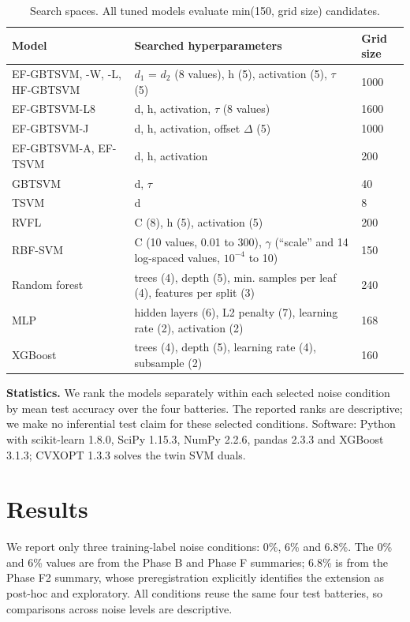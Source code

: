 \documentclass[conference,a4paper]{IEEEtran}
\begin{document}
\begin{table}[!t]
\centering
\small
\caption{Search spaces. All tuned models evaluate min(150, grid size) candidates.}
\label{tab:3}
\begin{tabularx}{\textwidth}{lXl}
\toprule
Model & Searched hyperparameters & Grid size \\
\midrule
EF-GBTSVM, -W, -L, HF-GBTSVM & $d_{1}$ = $d_{2}$ (8 values), h (5), activation (5), $\tau$ (5) & 1000 \\
EF-GBTSVM-L8 & d, h, activation, $\tau$ (8 values) & 1600 \\
EF-GBTSVM-J & d, h, activation, offset $\Delta$ (5) & 1000 \\
EF-GBTSVM-A, EF-TSVM & d, h, activation & 200 \\
GBTSVM & d, $\tau$ & 40 \\
TSVM & d & 8 \\
RVFL \cite{r4} & C (8), h (5), activation (5) & 200 \\
RBF-SVM \cite{r5} & C (10 values, 0.01 to 300), $\gamma$ (``scale'' and 14 log-spaced values, $10^{-4}$ to 10) & 150 \\
Random forest \cite{r6} & trees (4), depth (5), min. samples per leaf (4), features per split (3) & 240 \\
MLP & hidden layers (6), L2 penalty (7), learning rate (2), activation (2) & 168 \\
XGBoost \cite{r20} & trees (4), depth (5), learning rate (4), subsample (2) & 160 \\
\bottomrule
\end{tabularx}
\end{table}

\textbf{Statistics.} We rank the models separately within each selected noise condition by mean test accuracy over the four batteries. The reported ranks are descriptive; we make no inferential test claim for these selected conditions. Software: Python with scikit-learn 1.8.0, SciPy 1.15.3, NumPy 2.2.6, pandas 2.3.3 and XGBoost 3.1.3; CVXOPT 1.3.3 solves the twin SVM duals.

\section{Results}

We report only three training-label noise conditions: 0\%, 6\% and 6.8\%. The 0\% and 6\% values are from the Phase B and Phase F summaries; 6.8\% is from the Phase F2 summary, whose preregistration explicitly identifies the extension as post-hoc and exploratory. All conditions reuse the same four test batteries, so comparisons across noise levels are descriptive.
\end{document}
